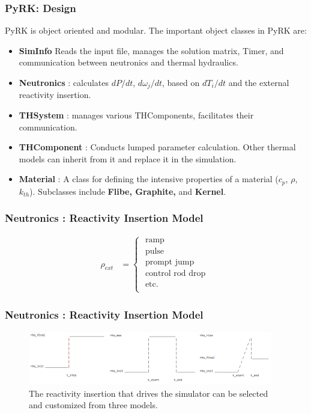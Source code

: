 \begin{frame}[fragile]
\frametitle{PyRK: Design}
\footnotesize{
PyRK is object oriented and modular. The important object classes in PyRK are:
\begin{itemize}
\item \textbf{SimInfo} Reads the input file, manages the solution matrix, Timer, and communication between neutronics and thermal hydraulics.
\item \textbf{Neutronics} : calculates $dP/dt$, $d\omega_j/dt$, based on
$dT_i/dt$ and the external reactivity insertion.
\item \textbf{THSystem} : manages various THComponents, facilitates their
communication.
\item \textbf{THComponent} : Conducts lumped parameter calculation. Other
thermal models can inherit from it and replace it in the simulation.
\item \textbf{Material} : A class for defining the intensive properties of a
material ($c_p$, $\rho$, $k_{th}$). Subclasses include \textbf{Flibe,
Graphite,} and \textbf{Kernel}.
\end{itemize}
}
\end{frame}
\begin{frame}[fragile]
  \frametitle{Neutronics : Reactivity Insertion Model}
  \begin{align}
    \rho_{ext} &= \left\{
                  \begin{array}{l}
                            \mbox{ ramp } \\
                            \mbox{ pulse } \\
                            \mbox{ prompt jump }\\
                            \mbox{ control rod drop }\\
                            \mbox{ etc. } \\
                  \end{array}
                  \right.
  \end{align}
\end{frame}

\begin{frame}[fragile]
  \frametitle{Neutronics : Reactivity Insertion Model}
  \begin{figure}[htbp!]
    \begin{center}
      \includegraphics[width=0.95\textwidth]{./progress/ri.png}
    \end{center}
    \caption{The reactivity insertion that drives the simulator can be selected
    and customized from three models.  }
    \label{fig:ri}
  \end{figure}

\end{frame}

